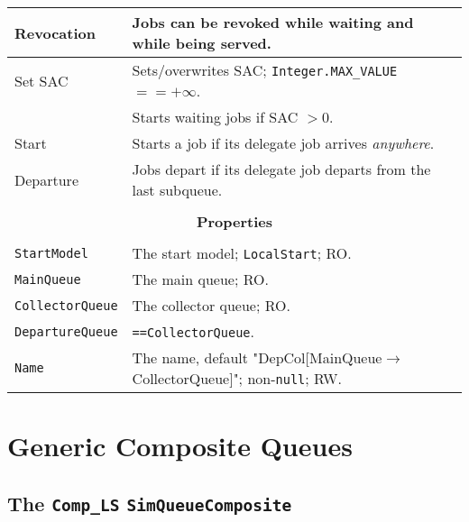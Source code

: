 \begin{tabular}{|l|l|}
	\hline
	Revocation & Jobs can be revoked while waiting and while being served. \\
	\hline
	Set SAC & Sets/overwrites SAC; \lstinline|Integer.MAX_VALUE| $== +\infty$. \\
	& Starts waiting jobs if SAC $> 0$. \\
	\hline
	Start & Starts a job if its delegate job arrives {\em anywhere}. \\
	\hline
	Departure & Jobs depart if its delegate job departs from the last subqueue. \\
	\hline
	\multicolumn{2}{|c|}{} \\
	\multicolumn{2}{|c|}{\bf Properties} \\
	\multicolumn{2}{|c|}{} \\
	\hline
	\lstinline|StartModel|    & The start model; \lstinline|LocalStart|; RO. \\
	\hline
	\lstinline|MainQueue| & The main queue; RO. \\
	\hline
	\lstinline|CollectorQueue| & The collector queue; RO. \\
	\hline
	\lstinline|DepartureQueue| & \lstinline|==CollectorQueue|. \\
	\hline
	\lstinline|Name|          & The name, default "DepCol[MainQueue$\rightarrow$CollectorQueue]"; non-\lstinline|null|; RW. \\
	\hline
\end{tabular}

\section{Generic Composite Queues}

\subsection{The \lstinline{Comp_LS} \lstinline{SimQueueComposite}}
\label{sec:Comp_LS}

